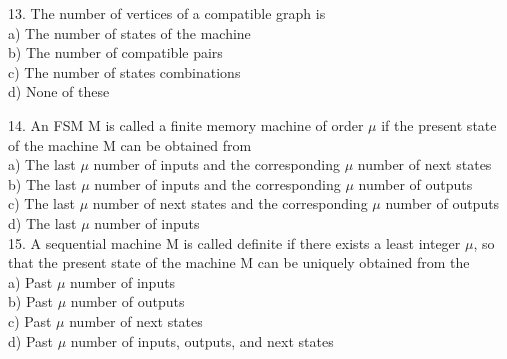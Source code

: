 \documentclass[8pt]{beamer}
\begin{document}
\begin{frame}
\begin{multicols}{2}
\vspace*{0.3cm}
13. The number of vertices of a compatible
graph is\\
\hspace*{0.4cm} a) The number of states of the machine\\
\hspace*{0.4cm} b) The number of compatible pairs\\
\hspace*{0.4cm} c) The number of states combinations\\
\hspace*{0.4cm} d) None of these\\
\end{multicols}
\end{frame}

\begin{frame}
\begin{multicols}{2}
14. An FSM M is called a finite memory
machine of order $\mu$ if the present state of the
machine M can be obtained from\\
\hspace*{0.4cm} a) The last $\mu$ number of inputs and the
corresponding $\mu$ number of next states\\
\hspace*{0.4cm} b) The last $\mu$ number of inputs and the
corresponding $\mu$ number of outputs\\
\hspace*{0.4cm} c) The last $\mu$ number of next states and the
corresponding $\mu$ number of outputs\\
\hspace*{0.4cm} d) The last $\mu$ number of inputs\\

\vspace*{0.3cm}
15. A sequential machine M is called definite if
there exists a least integer $\mu$, so that the present
state of the machine M can be uniquely
obtained from the\\
\hspace*{0.4cm} a) Past $\mu$ number of inputs\\
\hspace*{0.4cm} b) Past $\mu$ number of outputs\\
\hspace*{0.4cm} c) Past $\mu$ number of next states\\
\hspace*{0.4cm} d) Past $\mu$ number of inputs, outputs, and
next states\\


\end{multicols}
\end{frame}
\end{document}
